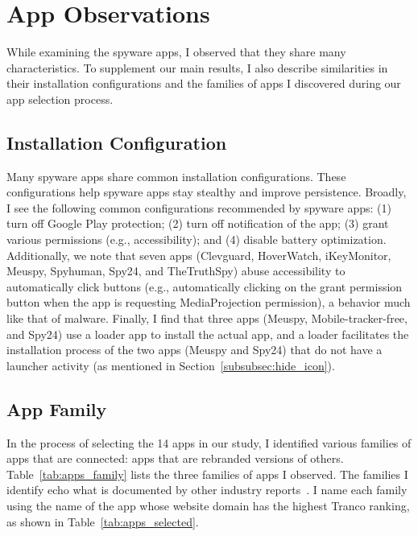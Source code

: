\hspace*{0.1in}\newpage
\appendix


\section{App Observations}
\label{subsec:additional_observation}

While examining the spyware apps, I observed that they
share many characteristics.  To supplement our main results, I also
describe similarities in their installation configurations and the
families of apps I discovered during our app selection process.

\subsection{Installation Configuration}
\label{subsubsec:install_configure}

Many spyware apps share common installation configurations.  These
configurations help spyware apps stay stealthy and improve
persistence. Broadly, I see the following common configurations
recommended by spyware apps: (1) turn off Google Play protection; (2)
turn off notification of the app; (3) grant various permissions (e.g.,
accessibility); and (4) disable battery optimization.  Additionally,
we note that seven apps (Clevguard, HoverWatch, iKeyMonitor, Meuspy, Spyhuman, Spy24, and TheTruthSpy) abuse accessibility to
automatically click buttons (e.g., automatically clicking on the grant permission button when the app is requesting MediaProjection permission), a
behavior much like that of malware. Finally, I find that three apps
(Meuspy, Mobile-tracker-free, and Spy24) use a loader app to install
the actual app, and a loader facilitates the installation process of the two apps (Meuspy and Spy24) that do not have a launcher activity (as mentioned in Section~\ref{subsubsec:hide_icon}).

\subsection{App Family}
\label{subsubsec:app_family}

In the process of selecting the 14 apps in our study, I identified
various families of apps that are connected: apps
that are rebranded versions of others.  Table~\ref{tab:apps_family} lists the
three families of apps I observed. The families I identify echo what is documented by
other industry reports~\cite{Tekstalk86:online,
esetandr4:online}. I name each family using the name
of the app whose website domain has the highest Tranco ranking, as shown in
Table~\ref{tab:apps_selected}.

